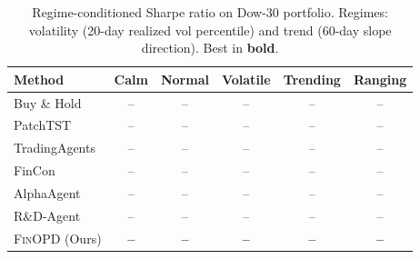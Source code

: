 \begin{table}[t]
\renewcommand{\arraystretch}{0.95}
\footnotesize
\caption{Regime-conditioned Sharpe ratio on Dow-30 portfolio. Regimes: volatility (20-day realized vol percentile) and trend (60-day slope direction). Best in \textbf{bold}.}
\setlength{\abovecaptionskip}{0.1cm}
\centering
\setlength{\tabcolsep}{4pt}
\begin{tabular}{lccccc}
\toprule
Method & Calm & Normal & Volatile & Trending & Ranging \\
\midrule
Buy \& Hold & -- & -- & -- & -- & -- \\
PatchTST & -- & -- & -- & -- & -- \\
TradingAgents & -- & -- & -- & -- & -- \\
FinCon & -- & -- & -- & -- & -- \\
AlphaAgent & -- & -- & -- & -- & -- \\
R\&D-Agent & -- & -- & -- & -- & -- \\
\midrule
\textsc{FinOPD} (Ours) & \textbf{--} & \textbf{--} & \textbf{--} & \textbf{--} & \textbf{--} \\
\bottomrule
\end{tabular}
\label{tab:regime}
\end{table}
